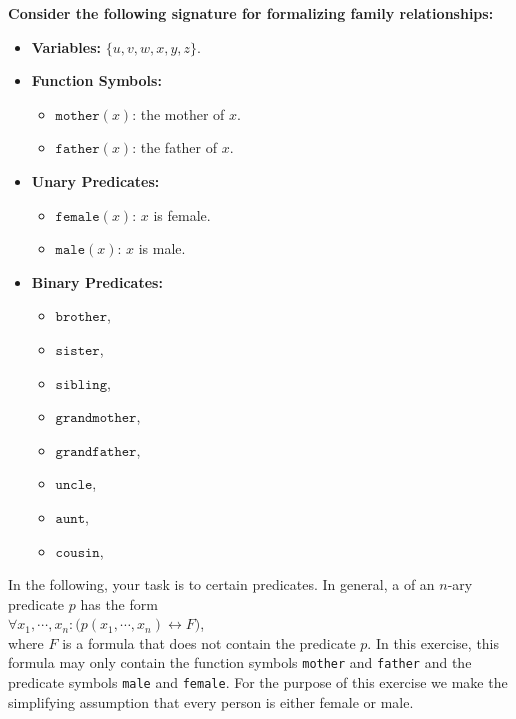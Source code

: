 \exerciseEng
\noindent \textbf{Consider the following signature for formalizing family relationships:}
\begin{itemize}
    \item \textbf{Variables:} $\{ u, v, w, x, y, z \}$.
    \item \textbf{Function Symbols:}
    \begin{itemize}
        \item $\texttt{mother}(x)$: the mother of $x$.
        \item $\texttt{father}(x)$: the father of $x$.
    \end{itemize}
    \item \textbf{Unary Predicates:}
    \begin{itemize}
        \item $\texttt{female}(x)$: $x$ is female.
        \item $\texttt{male}(x)$: $x$ is male.
    \end{itemize}
    \item \textbf{Binary Predicates:}
    \begin{itemize}
    \item $\texttt{brother}$,
    \item $\texttt{sister}$,
    \item $\texttt{sibling}$,
    \item $\texttt{grandmother}$,
    \item $\texttt{grandfather}$,
    \item $\texttt{uncle}$,
    \item $\texttt{aunt}$,
    \item $\texttt{cousin}$,
    \end{itemize}
\end{itemize}
In the following, your task is to  certain predicates. In general, a  of an
$n$-ary predicate $p$ has the form 
\\[0.2cm]
\hspace*{1.3cm}
$\forall x_1, \cdots, x_n: \bigl(p(x_1,\cdots,x_n) \leftrightarrow F\bigr)$,
\\[0.2cm]
where $F$ is a formula that does not contain the predicate $p$.  In this exercise, this formula
may only contain the function symbols \texttt{mother} and \texttt{father} and the predicate symbols \texttt{male} and
\texttt{female}.  For the purpose of this exercise we make the simplifying assumption that
every person is either female or male.

